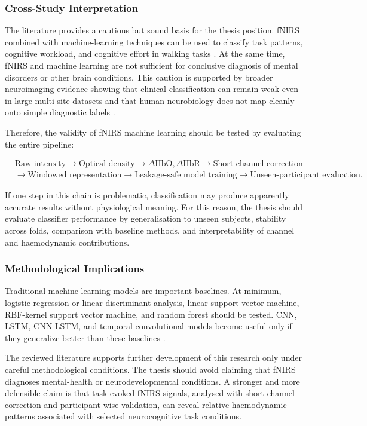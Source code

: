 \subsubsection{Cross-Study Interpretation}

The literature provides a cautious but sound basis for the thesis position. fNIRS combined with
machine-learning techniques can be used to classify task patterns, cognitive workload, and cognitive
effort in walking tasks \cite{Wickramaratne2021,Khan2025,Ma2023,Sharmin2026,Qin2024,Benerradi2023}.
At the same time, fNIRS and machine learning are not sufficient for conclusive diagnosis of mental
disorders or other brain conditions. This caution is supported by broader neuroimaging evidence
showing that clinical classification can remain weak even in large multi-site datasets and that
human neurobiology does not map cleanly onto simple diagnostic labels \cite{Belov2024,Beam2021}.

Therefore, the validity of fNIRS machine learning should be tested by evaluating the entire
pipeline:

\begin{equation}
\begin{aligned}
&\text{Raw intensity}
\rightarrow
\text{Optical density}
\rightarrow
\Delta \mathrm{HbO},\Delta \mathrm{HbR}
\rightarrow
\text{Short-channel correction}\\
&\rightarrow
\text{Windowed representation}
\rightarrow
\text{Leakage-safe model training}
\rightarrow
\text{Unseen-participant evaluation}.
\end{aligned}
\end{equation}

If one step in this chain is problematic, classification may produce apparently accurate results
without physiological meaning. For this reason, the thesis should evaluate classifier performance by
generalisation to unseen subjects, stability across folds, comparison with baseline methods, and
interpretability of channel and haemodynamic contributions.

\subsubsection{Methodological Implications}

Traditional machine-learning models are important baselines. At minimum, logistic regression or
linear discriminant analysis, linear support vector machine, RBF-kernel support vector machine, and
random forest should be tested. CNN, LSTM, CNN-LSTM, and temporal-convolutional models become useful
only if they generalize better than these baselines \cite{Benerradi2023,Khan2025,Qin2024}.

The reviewed literature supports further development of this research only under careful
methodological conditions. The thesis should avoid claiming that fNIRS diagnoses mental-health or
neurodevelopmental conditions. A stronger and more defensible claim is that task-evoked fNIRS
signals, analysed with short-channel correction and participant-wise validation, can reveal relative
haemodynamic patterns associated with selected neurocognitive task conditions.
